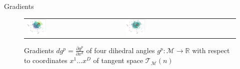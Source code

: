 \begin{frame}{Gradients}
\begin{figure}[!htp]
\begin{tabular}{p{2.5cm}p{2.5cm}p{2.5cm}p{2.5cm}}
         \includegraphics[width=0.2\textwidth]{img/tangent_2.png}  &
          \includegraphics[width=0.2\textwidth]{img/tangent_3.png} 
    \end{tabular}
    \caption*{ Gradients $dg^p = \frac{\partial g^p }{\partial x^d} $ of four dihedral angles $g^p:\mathcal M \to \mathbb R$ with respect to coordinates $x^1 \dots x^D$ of tangent space $\mathcal {T}_{\mathcal M} (n)$}
\end{figure}
\end{frame}


